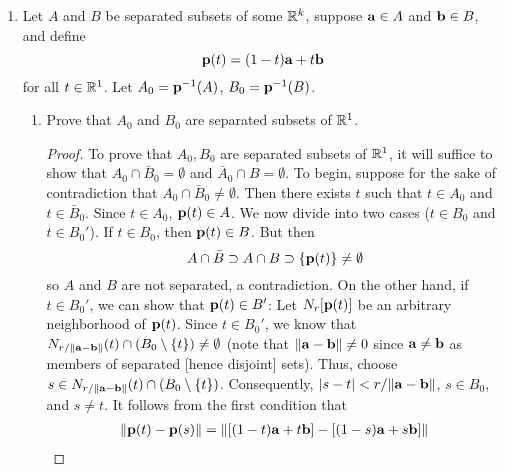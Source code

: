 \documentclass[../psets.tex]{subfiles}
\begin{document}
\begin{enumerate}[label={\textbf{\arabic*.}}]
\begin{proof}
        Interiors of connected sets are not always connected.\par
        Consider the set $X=\overline{N_1(1,0)}\cup\overline{N_1(-1,0)}\subset\R^2$. $X$ is connected since both closed ball components are connected and the two components have nonempty intersection. Moreover, $X^\circ=N_1(1,0)\cup N_1(-1,0)$ is disconnected: Choose $A=N_1(1,0)$ and $B=N_1(-1,0)$. Then $A,B$ are nonempty. Additionally, $A\cap\bar{B}=\emptyset$ since every point of $A$ has $x$-component greater than zero and every point of $\bar{B}$ has $x$ component less than or equal to zero.
    \end{proof}
    \item Let $A$ and $B$ be separated subsets of some $\mathbb{R}^k$, suppose $\mathbf{a}\in A$ and $\mathbf{b}\in B$, and define
    \begin{equation*}
        \mathbf{p}(t) = (1-t)\mathbf{a}+t\mathbf{b}
    \end{equation*}
    for all $t\in\mathbb{R}^1$. Let $A_0=\mathbf{p}^{-1}(A)$, $B_0=\mathbf{p}^{-1}(B)$.
    \begin{enumerate}
        \item Prove that $A_0$ and $B_0$ are separated subsets of $\mathbb{R}^1$.
        \begin{proof}
            To prove that $A_0,B_0$ are separated subsets of $\mathbb{R}^1$, it will suffice to show that $A_0\cap\bar{B}_0=\emptyset$ and $\bar{A}_0\cap B=\emptyset$. To begin, suppose for the sake of contradiction that $A_0\cap\bar{B}_0\neq\emptyset$. Then there exists $t$ such that $t\in A_0$ and $t\in\bar{B}_0$. Since $t\in A_0$, $\mathbf{p}(t)\in A$. We now divide into two cases ($t\in B_0$ and $t\in B_0'$). If $t\in B_0$, then $\mathbf{p}(t)\in B$. But then
            \begin{equation*}
                A\cap\bar{B} \supset A\cap B
                \supset \{\mathbf{p}(t)\}
                \neq \emptyset
            \end{equation*}
            so $A$ and $B$ are not separated, a contradiction. On the other hand, if $t\in B_0'$, we can show that $\mathbf{p}(t)\in B'$: Let $N_r[\mathbf{p}(t)]$ be an arbitrary neighborhood of $\mathbf{p}(t)$. Since $t\in B_0'$, we know that $N_{r/\norm{\mathbf{a}-\mathbf{b}}}(t)\cap(B_0\setminus\{t\})\neq\emptyset$ (note that $\norm{\mathbf{a}-\mathbf{b}}\neq 0$ since $\mathbf{a}\neq\mathbf{b}$ as members of separated [hence disjoint] sets). Thus, choose $s\in N_{r/\norm{\mathbf{a}-\mathbf{b}}}(t)\cap(B_0\setminus\{t\})$. Consequently, $|s-t|<r/\norm{\mathbf{a}-\mathbf{b}}$, $s\in B_0$, and $s\neq t$. It follows from the first condition that
            \begin{align*}
                \norm{\pp(t)-\pp(s)} &= \norm{[(1-t)\ab+t\bb]-[(1-s)\ab+s\bb]}\\

\end{align*}
\end{proof}
\end{enumerate}
\end{enumerate}
\end{document}
